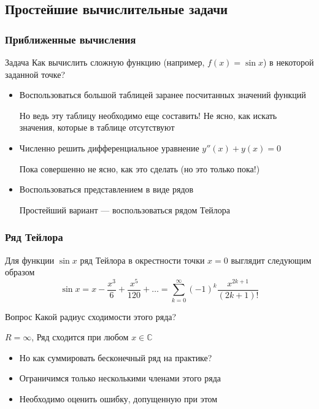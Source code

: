 \documentclass[aspectratio=43,unicode]{beamer}
\begin{document}
\subsection{Простейшие вычислительные задачи}
\begin{frame}
\frametitle{Приближенные вычисления}
\begin{block}{Задача}
	Как вычислить сложную функцию (например, $f(x) = \sin x$) в некоторой заданной точке?
\end{block}

\begin{itemize}
	\pause \item Воспользоваться большой таблицей заранее посчитанных значений функций
	\pause

	\alert{Но ведь эту таблицу необходимо еще составить!}
	\alert{Не ясно, как искать значения, которые в таблице отсутствуют}
	\pause \item Численно решить дифференциальное уравнение $y''(x) + y(x) = 0$
	\pause

	\alert{Пока совершенно не ясно, как это сделать (но это только пока!)}
	\pause \item Воспользоваться представлением в виде рядов
	\pause

	\textcolor{green!50!black}{Простейший вариант --- воспользоваться рядом Тейлора}
\end{itemize}
\end{frame}

\begin{frame}
\frametitle{Ряд Тейлора}
	Для функции $\sin x$ ряд Тейлора в окрестности точки $x=0$ выглядит следующим образом
	\[
	\sin x = x - \frac{x^3}{6} + \frac{x^5}{120} + \dots = \sum_{k=0}^{\infty} (-1)^k\frac{x^{2k+1}}{(2k+1)!}
	\]
	\pause
	\begin{block}{Вопрос}
	Какой радиус сходимости этого ряда?
	\pause

	$R = \infty$, Ряд сходится при любом $x \in \mathbb{C}$
	\end{block}
	\begin{itemize}
	\pause\item Но как суммировать бесконечный ряд на практике?
	\pause\item Ограничимся только несколькими членами этого ряда
	\pause\item Необходимо оценить ошибку, допущенную при этом
	\end{itemize}
\end{frame}
\end{document}
